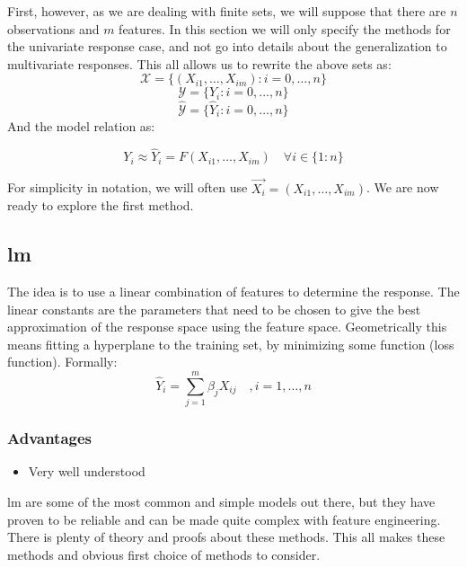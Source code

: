 First, however, as we are dealing with finite sets, we will suppose that there are $n$ observations and $m$ features. In this section we will only specify the methods for the univariate response case, and not go into details about the generalization to multivariate responses. This all allows us to rewrite the above sets as:
$$\mathcal{X}=\{(X_{i1},\dots,X_{im}) : i=0,\dots,n\}$$
$$\mathcal{Y}=\{Y_i : i=0,\dots,n\}$$
$$\hat{\mathcal{Y}}=\{\hat{Y}_i : i=0,\dots,n\}$$
And the model relation as:

$$
Y_i \approx \hat{Y}_i = F(X_{i1},\dots,X_{im}) \quad \forall i \in \{1:n\}
$$

For simplicity in notation, we will often use $ \vec{X_i}=(X_{i1},\dots,X_{im}) $. We are now ready to explore the first method.

\subsection{\acrlong{lm}}
The idea is to use a linear combination of features to determine the response. The linear constants are the parameters that need to be chosen to give the best approximation of the response space using the feature space. Geometrically this means fitting a hyperplane to the training set, by minimizing some function (loss function).
Formally:
$$
\hat{Y}_i = \sum_{j=1}^m \beta_{j} X_{ij} \quad, i=1,\dots,n
$$

\subsubsection{Advantages}
\begin{itemize}
\item Very well understood
\end{itemize}

\acrlong{lm} are some of the most common and simple models out there, but they have proven to be reliable and can be made quite complex with feature engineering. There is plenty of theory and proofs about these methods. This all makes these methods and obvious first choice of methods to consider.
